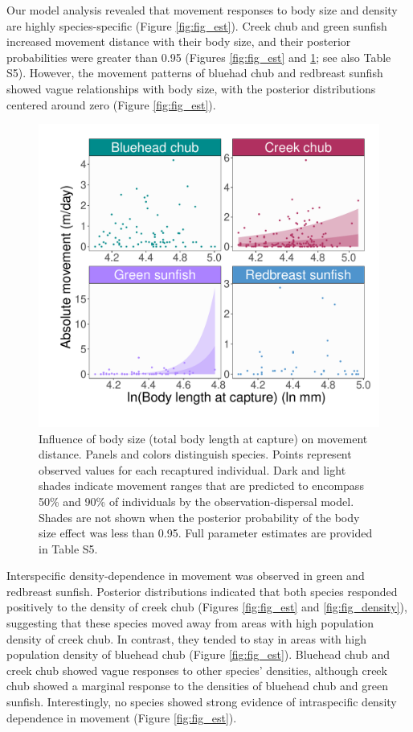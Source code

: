 \documentclass[11pt, class=article, crop=false]{standalone}
\begin{document}
Our model analysis revealed that movement responses to body size and density are highly species-specific (Figure \ref{fig:fig_est}). Creek chub and green sunfish increased movement distance with their body size, and their posterior probabilities were greater than 0.95 (Figures \ref{fig:fig_est} and \ref{fig:fig_size}; see also Table S5). 
However, the movement patterns of bluehad chub and redbreast sunfish showed vague relationships with body size, with the posterior distributions centered around zero (Figure \ref{fig:fig_est}).

\begin{figure}
    \centering
    \includegraphics[width=0.75\linewidth]{output/fig_size.pdf}
    \caption{Influence of body size (total body length at capture) on movement distance. Panels and colors distinguish species. Points represent observed values for each recaptured individual. Dark and light shades indicate movement ranges that are predicted to encompass 50\% and 90\% of individuals by the observation-dispersal model. Shades are not shown when the posterior probability of the body size effect was less than 0.95. Full parameter estimates are provided in Table S5.}
    \label{fig:fig_size}
\end{figure}

Interspecific density-dependence in movement was observed in green and redbreast sunfish. Posterior distributions indicated that both species responded positively to the density of creek chub (Figures \ref{fig:fig_est} and \ref{fig:fig_density}), suggesting that these species moved away from areas with high population density of creek chub. 
In contrast, they tended to stay in areas with high population density of bluehead chub (Figure \ref{fig:fig_est}).
Bluehead chub and creek chub showed vague responses to other species' densities, although creek chub showed a marginal response to the densities of bluehead chub and green sunfish.
Interestingly, no species showed strong evidence of intraspecific density dependence in movement (Figure \ref{fig:fig_est}).
\end{document}
